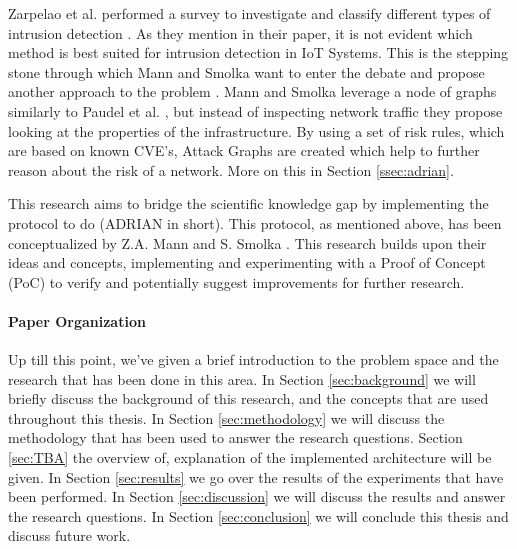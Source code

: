 Zarpelao et al. performed a survey to investigate and classify different types of intrusion detection \cite{zarpelao2017survey}. As they mention in their paper, it is not evident which method is best suited for intrusion detection in IoT Systems. This is the stepping stone through which Mann and Smolka want to enter the debate and propose another approach to the problem \cite{mann2023ADRIAN}. 
Mann and Smolka leverage a node of graphs similarly to Paudel et al. \cite{paudel2019detecting}, but instead of inspecting network traffic they propose looking at the properties of the infrastructure. By using a set of risk rules, which are based on known CVE's, Attack Graphs are created which help to further reason about the risk of a network. More on this in Section \ref{ssec:adrian}.

This research aims to bridge the scientific knowledge gap by implementing the protocol to do \ADRIAN (ADRIAN in short). This protocol, as mentioned above, has been conceptualized by Z.A. Mann and S. Smolka \cite{mann2023ADRIAN}. This research builds upon their ideas and concepts, implementing and experimenting with a Proof of Concept (PoC) to verify and potentially suggest improvements for further research. 


\paragraph{Paper Organization}
Up till this point, we've given a brief introduction to the problem space and the research that has been done in this area. In Section \ref{sec:background} we will briefly discuss the background of this research, and the concepts that are used throughout this thesis. In Section \ref{sec:methodology} we will discuss the methodology that has been used to answer the research questions. Section \ref{sec:TBA} the overview of, explanation of the implemented architecture will be given. In Section \ref{sec:results} we go over the results of the experiments that have been performed. In Section \ref{sec:discussion} we will discuss the results and answer the research questions. In Section \ref{sec:conclusion} we will conclude this thesis and discuss future work.
